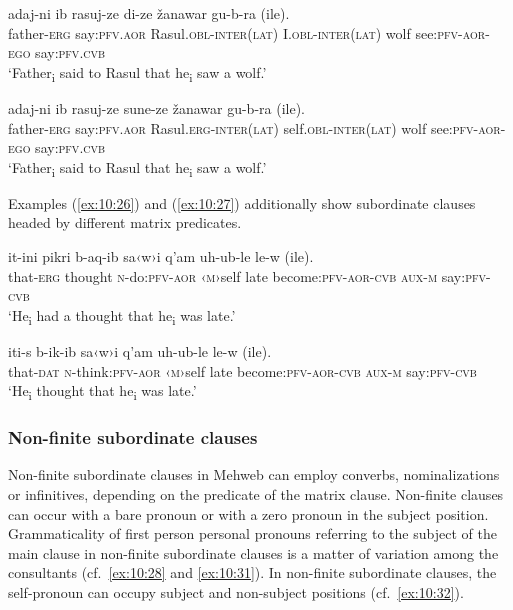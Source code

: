 ﻿\documentclass[output=paper]{langsci/langscibook}
\begin{document}
\ex \label{ex:10:24} %
\gll  adaj-ni ib rasuj-ze di-ze žanawar gu-b-ra (ile).\\
father-\textsc{erg} say:\textsc{pfv}.\textsc{aor} Rasul.\textsc{obl}-\textsc{inter}(\textsc{lat}) I.\textsc{obl}-\textsc{inter}(\textsc{lat}) wolf see:\textsc{pfv}-\textsc{aor}-\textsc{ego} say:\textsc{pfv}.\textsc{cvb}\\ 
\glt `Father\textsubscript{i} said to Rasul that he\textsubscript{i} saw a
wolf.'

\ex \label{ex:10:25} %
\gll  adaj-ni ib rasuj-ze sune-ze žanawar gu-b-ra (ile).\\
father-\textsc{erg} say:\textsc{pfv}.\textsc{aor} Rasul.\textsc{erg}-\textsc{inter}(\textsc{lat}) self.\textsc{obl}-\textsc{inter}(\textsc{lat}) wolf see:\textsc{pfv}-\textsc{aor}-\textsc{ego} say:\textsc{pfv}.\textsc{cvb}\\ 
\glt `Father\textsubscript{i} said to Rasul that he\textsubscript{i} saw a
wolf.'

\z



Examples (\ref{ex:10:26}) and (\ref{ex:10:27}) additionally show subordinate clauses headed by
different matrix predicates.

\ea \label{ex:10:26} %
\gll  it-ini pikri b-aq-ib sa‹w›i q'am uh-ub-le le-w (ile).\\
that-\textsc{erg} thought \textsc{n}-do:\textsc{pfv}-\textsc{aor} ‹\textsc{m}›self late become:\textsc{pfv}-\textsc{aor}-\textsc{cvb} \textsc{aux}-\textsc{m} say:\textsc{pfv}-\textsc{cvb}\\
\glt `He\textsubscript{i} had a thought that he\textsubscript{i} was late.'

\ex \label{ex:10:27} %
\gll  iti-s b-ik-ib sa‹w›i q'am uh-ub-le le-w (ile).\\
that-\textsc{dat} \textsc{n}-think:\textsc{pfv}-\textsc{aor} ‹\textsc{m}›self late become:\textsc{pfv}-\textsc{aor}-\textsc{cvb} \textsc{aux}-\textsc{m} say:\textsc{pfv}-\textsc{cvb}\\ 
\glt `He\textsubscript{i} thought that he\textsubscript{i} was late.'
\z

\subsubsection{Non-finite subordinate clauses}

Non-finite subordinate clauses in Mehweb can employ converbs,
nominalizations or infinitives, depending on the predicate of the matrix
clause. Non-finite clauses can occur with a bare pronoun or with a zero
pronoun in the subject position. Grammaticality of first person personal
pronouns referring to the subject of the main clause in non-finite
subordinate clauses is a matter of variation among the consultants (cf.\
\ref{ex:10:28} and \ref{ex:10:31}). In non-finite subordinate clauses, the self-pronoun can
occupy subject and non-subject positions (cf.\ \ref{ex:10:32}).
\end{document}
